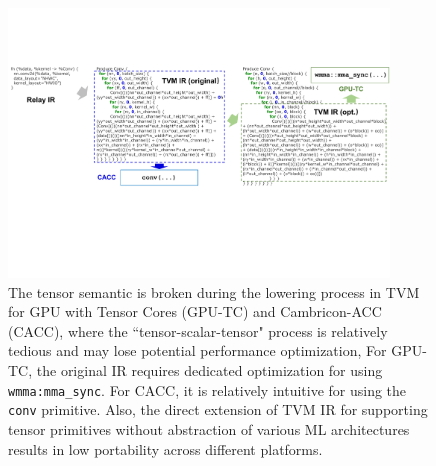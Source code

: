 \begin{figure}
\centering
\includegraphics[width=0.9\textwidth]{figures/intro-tvm.pdf}
\vspace{-5pt}
\caption{\footnotesize The tensor semantic is broken during the lowering process in TVM for GPU with Tensor Cores (GPU-TC) and Cambricon-ACC (CACC), where the ``tensor-scalar-tensor" process is relatively tedious and may lose potential performance optimization, For GPU-TC, the original IR requires dedicated optimization for using \texttt{wmma:mma\_sync}. For CACC, it is relatively intuitive for using the \texttt{conv} primitive. Also, the direct extension of TVM IR for supporting tensor primitives without abstraction of various ML architectures results in low portability across different platforms.}
\label{fig:intro-tvm}
\vspace{-5pt}
\end{figure}

